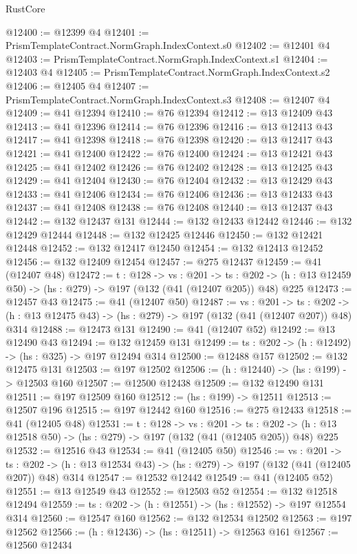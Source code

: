 \begin{lexlean}{RustCore}
\begin{coremodule}
@12400 := @12399 @4
@12401 := PrismTemplateContract.NormGraph.IndexContext.s0
@12402 := @12401 @4
@12403 := PrismTemplateContract.NormGraph.IndexContext.s1
@12404 := @12403 @4
@12405 := PrismTemplateContract.NormGraph.IndexContext.s2
@12406 := @12405 @4
@12407 := PrismTemplateContract.NormGraph.IndexContext.s3
@12408 := @12407 @4
@12409 := @41 @12394
@12410 := @76 @12394
@12412 := @13 @12409 @43
@12413 := @41 @12396
@12414 := @76 @12396
@12416 := @13 @12413 @43
@12417 := @41 @12398
@12418 := @76 @12398
@12420 := @13 @12417 @43
@12421 := @41 @12400
@12422 := @76 @12400
@12424 := @13 @12421 @43
@12425 := @41 @12402
@12426 := @76 @12402
@12428 := @13 @12425 @43
@12429 := @41 @12404
@12430 := @76 @12404
@12432 := @13 @12429 @43
@12433 := @41 @12406
@12434 := @76 @12406
@12436 := @13 @12433 @43
@12437 := @41 @12408
@12438 := @76 @12408
@12440 := @13 @12437 @43
@12442 := @132 @12437 @131
@12444 := @132 @12433 @12442
@12446 := @132 @12429 @12444
@12448 := @132 @12425 @12446
@12450 := @132 @12421 @12448
@12452 := @132 @12417 @12450
@12454 := @132 @12413 @12452
@12456 := @132 @12409 @12454
@12457 := @275 @12437
@12459 := @41 (@12407 @48)
@12472 := {t : @128} ->
  {vs : @201} ->
  {ts : @202} -> (h : @13 @12459 @50) -> (hs : @279) -> @197 (@132 (@41 (@12407 @205)) @48) @225
@12473 := @12457 @43
@12475 := @41 (@12407 @50)
@12487 := {vs : @201} ->
  {ts : @202} -> (h : @13 @12475 @43) -> (hs : @279) -> @197 (@132 (@41 (@12407 @207)) @48) @314
@12488 := @12473 @131
@12490 := @41 (@12407 @52)
@12492 := @13 @12490 @43
@12494 := @132 @12459 @131
@12499 := {ts : @202} -> (h : @12492) -> (hs : @325) -> @197 @12494 @314
@12500 := @12488 @157
@12502 := @132 @12475 @131
@12503 := @197 @12502
@12506 := (h : @12440) -> (hs : @199) -> @12503 @160
@12507 := @12500 @12438
@12509 := @132 @12490 @131
@12511 := @197 @12509 @160
@12512 := (hs : @199) -> @12511
@12513 := @12507 @196
@12515 := @197 @12442 @160
@12516 := @275 @12433
@12518 := @41 (@12405 @48)
@12531 := {t : @128} ->
  {vs : @201} ->
  {ts : @202} -> (h : @13 @12518 @50) -> (hs : @279) -> @197 (@132 (@41 (@12405 @205)) @48) @225
@12532 := @12516 @43
@12534 := @41 (@12405 @50)
@12546 := {vs : @201} ->
  {ts : @202} -> (h : @13 @12534 @43) -> (hs : @279) -> @197 (@132 (@41 (@12405 @207)) @48) @314
@12547 := @12532 @12442
@12549 := @41 (@12405 @52)
@12551 := @13 @12549 @43
@12552 := @12503 @52
@12554 := @132 @12518 @12494
@12559 := {ts : @202} -> (h : @12551) -> (hs : @12552) -> @197 @12554 @314
@12560 := @12547 @160
@12562 := @132 @12534 @12502
@12563 := @197 @12562
@12566 := (h : @12436) -> (hs : @12511) -> @12563 @161
@12567 := @12560 @12434

\end{coremodule}
\end{lexlean}
